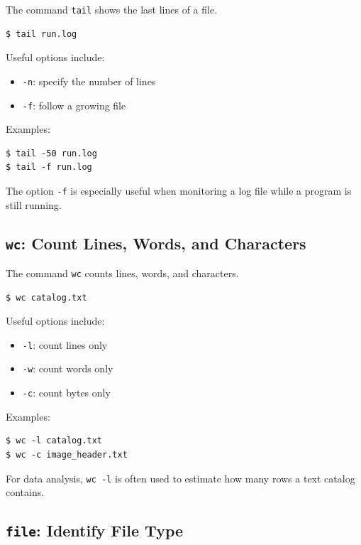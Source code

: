 The command \texttt{tail} shows the last lines of a file.

\begin{lstlisting}
$ tail run.log
\end{lstlisting}

Useful options include:

\begin{itemize}
\item \texttt{-n}: specify the number of lines
\item \texttt{-f}: follow a growing file
\end{itemize}

Examples:

\begin{lstlisting}
$ tail -50 run.log
$ tail -f run.log
\end{lstlisting}

The option \texttt{-f} is especially useful when monitoring a log file
while a program is still running.

\subsection{\texttt{wc}: Count Lines, Words, and Characters}

The command \texttt{wc} counts lines, words, and characters.

\begin{lstlisting}
$ wc catalog.txt
\end{lstlisting}

Useful options include:

\begin{itemize}
\item \texttt{-l}: count lines only
\item \texttt{-w}: count words only
\item \texttt{-c}: count bytes only
\end{itemize}

Examples:

\begin{lstlisting}
$ wc -l catalog.txt
$ wc -c image_header.txt
\end{lstlisting}

For data analysis, \texttt{wc -l} is often used to estimate how many rows
a text catalog contains.

\subsection{\texttt{file}: Identify File Type}


